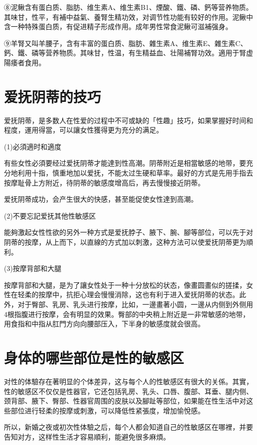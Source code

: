\documentclass[12pt,UTF8]{ctexbook}
\begin{document}
⑧泥鳅含有蛋白质、脂肪、维生素A、维生素B1、煙酸、鐵、磷、鈣等营养物质。其味甘，性平，有補中益氣、養腎生精功效，对调节性功能有较好的作用。泥鳅中含一种特殊蛋白质，有促进精子形成作用。成年男性常食泥鳅可滋補强身。

⑨羊腎又叫羊腰子，含有丰富的蛋白质、脂肪、雜生素A、维生素E、雜生素C、鈣、鐵、磷等营养物质。其味甘，性温，有生精益血、壮陽補腎功效。適用于腎虚陽痿者食用。

\section{爱抚阴蒂的技巧}

爱抚阴蒂，是多数人在性爱的过程中不可或缺的「性趣」技巧，如果掌握好时间和程度，運用得當，可以讓女性獲得更为充分的满足。

(1)必須適时和適度

有些女性必須要经过爱抚阴蒂才能達到性高潮。阴蒂附近是相當敏感的地带，要充分地利用十指，慎重地加以爱抚，不能太过生硬和草率。最好的方式是先用手指去按摩耻骨上方附近，待阴蒂的敏感度增高后，再去慢慢接近阴蒂。

爱抚阴蒂成功，会产生很大的快感，甚至能促使女性達到高潮。

(2)不要忘記爱抚其他性敏感区

能夠激起女性性欲的另外一种方式是爱抚脖子、腋下、腕、腳等部位，可以先于对阴蒂的按摩，从上而下，以直線的方式加以刺激，这种方法可以使爱抚阴蒂更为順利。

(3)按摩背部和大腿

按摩背部和大腿，是为了讓女性处于一种十分放松的状态，像畫圆畫似的搓揉，女性在轻柔的按摩中，抗拒心理会慢慢消除，这也有利于进入爱抚阴蒂的状态。此外，对于臀部、乳房、乳头进行按摩，比如，一邊畫著小圆，一邊从内侧到外侧用4根指腹进行按摩，会有明显的效果。臀部的中央稍上附近是一非常敏感的地带，用食指和中指从肛門方向向腰部压入，下半身的敏感度就会很高。

\section{身体的哪些部位是性的敏感区}

对性的体驗存在著明显的个体差异，这与每个人的性敏感区有很大的关係。其實，性的敏感区不仅仅是性器官，它还包括乳房、乳头、口唇、腹部、耳垂、腿内侧、颈背部、腋下、臀部、性器官周围的皮肤以及腳趾等部位，如果能在性生活中对这些部位进行轻柔的按摩或刺激，可以降低性紧張度，增加愉悅感。

所以，新婚之夜或初次性体驗之后，每个人都会知道自己的性敏感区在哪裡，并要告知对方，这样性生活才容易順利，能避免很多麻煩。
\end{document}
